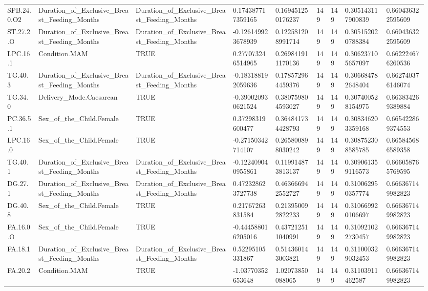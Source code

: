\begin{longtable}{lllllllll}
SPB.24.0.O2 & Duration\_of\_Exclusive\_Breast\_Feeding\_Months & Duration\_of\_Exclusive\_Breast\_Feeding\_Months & 0.174387717359165 & 0.169451250176237 & 149 & 149 & 0.305143117900839 & 0.660436322595609 \\
ST.27.2.O & Duration\_of\_Exclusive\_Breast\_Feeding\_Months & Duration\_of\_Exclusive\_Breast\_Feeding\_Months & -0.126149923678939 & 0.122581208991714 & 149 & 149 & 0.305152020788384 & 0.660436322595609 \\
LPC.16.1 & Condition.MAM & TRUE & 0.277073246514965 & 0.269841911170136 & 149 & 149 & 0.306237105657097 & 0.662224676260536 \\
TG.40.3 & Duration\_of\_Exclusive\_Breast\_Feeding\_Months & Duration\_of\_Exclusive\_Breast\_Feeding\_Months & -0.183188192059636 & 0.178572964459376 & 149 & 149 & 0.306684782648404 & 0.662740376146074 \\
TG.34.0 & Delivery\_Mode.Caesarean & TRUE & -0.390020930621524 & 0.380759804593027 & 149 & 149 & 0.307400528154975 & 0.663834269389884 \\
PC.36.5.1 & Sex\_of\_the\_Child.Female & TRUE & 0.37298319600477 & 0.364841734428793 & 149 & 149 & 0.308346203359168 & 0.665422869374553 \\
LPC.16.0 & Sex\_of\_the\_Child.Female & TRUE & -0.27150342714107 & 0.265800898030242 & 149 & 149 & 0.308752308585785 & 0.665845686589358 \\
TG.40.1 & Duration\_of\_Exclusive\_Breast\_Feeding\_Months & Duration\_of\_Exclusive\_Breast\_Feeding\_Months & -0.122409040955861 & 0.119914873813137 & 149 & 149 & 0.309061359116573 & 0.666058765769595 \\
DG.27.1 & Duration\_of\_Exclusive\_Breast\_Feeding\_Months & Duration\_of\_Exclusive\_Breast\_Feeding\_Months & 0.472328623727738 & 0.463666942552727 & 149 & 149 & 0.310062950357774 & 0.666367149982823 \\
DG.40.8 & Sex\_of\_the\_Child.Female & TRUE & 0.21767263831584 & 0.213950092822233 & 149 & 149 & 0.310669920106697 & 0.666367149982823 \\
FA.16.0.O & Sex\_of\_the\_Child.Female & TRUE & -0.444588016205016 & 0.437212511040991 & 149 & 149 & 0.310921022730457 & 0.666367149982823 \\
FA.18.1 & Duration\_of\_Exclusive\_Breast\_Feeding\_Months & Duration\_of\_Exclusive\_Breast\_Feeding\_Months & 0.52295105331867 & 0.514360143003821 & 149 & 149 & 0.311000329032453 & 0.666367149982823 \\
FA.20.2 & Condition.MAM & TRUE & -1.03770352653648 & 1.02073850088065 & 149 & 149 & 0.31103911462587 & 0.666367149982823 \\

\end{longtable}
